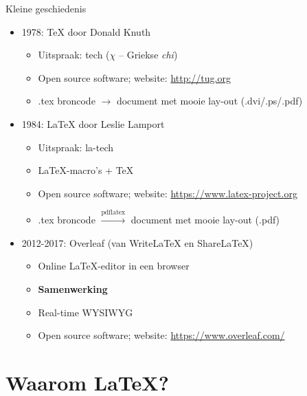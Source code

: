 \documentclass{beamer}
\begin{document}
\begin{frame}{Kleine geschiedenis}
\begin{itemize}
\item 1978: \alert{\TeX} door Donald Knuth
 \begin{itemize}
  \item Uitspraak: tech ($\chi$ -- Griekse \textit{chi})
  \item Open source software; website: \url{http://tug.org}
  \item .tex broncode $\rightarrow$ document met mooie lay-out (.dvi/.ps/.pdf) %
 \end{itemize}\pause
\item 1984: \alert{\LaTeX} door Leslie Lamport
 \begin{itemize}
  \item Uitspraak: la-tech
  \item \LaTeX-macro's + \TeX %
  \item Open source software; website: \url{https://www.latex-project.org}
  \item .tex broncode $\xrightarrow{\text{pdflatex}}$ document met mooie lay-out (.pdf)
 \end{itemize}\pause
\item 2012-2017: Overleaf (van WriteLaTeX en ShareLaTeX)
 \begin{itemize}
  \item Online \LaTeX-editor in een browser
  \item \textbf{Samenwerking}
  \item Real-time WYSIWYG
  \item Open source software; website: \url{https://www.overleaf.com/}
 \end{itemize}
\end{itemize}

\end{frame}


\section{Waarom \LaTeX?}
\end{document}
